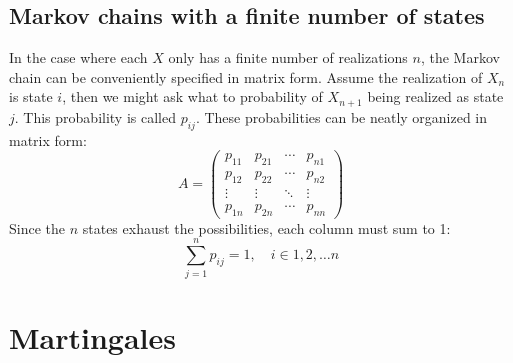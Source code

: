 \documentclass[12pt, a4paper]{article}
\numberwithin{equation}{section}
\begin{document}
\subsection{Markov chains with a finite number of states}
In the case where each $X$ only has a finite number of realizations $n$, the Markov chain can be conveniently specified in matrix form. Assume the realization of $X_n$ is state $i$, then we might ask what to probability of $X_{n+1}$ being realized as state $j$. This probability is called $p_{ij}$. These probabilities can be neatly organized in matrix form:
\begin{equation}
A=\begin{pmatrix}
p_{11}	& p_{21}	& \cdots	& p_{n1} \\
p_{12}	& p_{22}	& \cdots	& p_{n2} \\
\vdots	& \vdots	& \ddots	& \vdots \\
p_{1n}	& p_{2n}	& \cdots	& p_{nn}
\end{pmatrix}
\end{equation}
Since the $n$ states exhaust the possibilities, each column must sum to 1:
\begin{equation}
\sum_{j=1}^n p_{ij}=1,\quad i\in{1,2,\ldots n}
\end{equation}

\section{Martingales}
\end{document}
